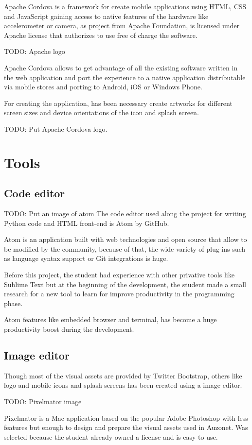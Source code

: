 \documentclass{DeustoFDP}
\begin{document}
Apache Cordova is a framework for create mobile applications using HTML, CSS and JavaScript gaining access to native features of the hardware like accelerometer or camera, as project from Apache Foundation, is licensed under Apache license that authorizes to use free of charge the software.

TODO: Apache logo

Apache Cordova allows to get advantage of all the existing software written in the web application and port the experience to a native application distributable via mobile stores and porting to Android, iOS or Windows Phone.

For creating the application, has been necessary create artworks for different screen sizes and device orientations of the icon and splash screen.

TODO: Put Apache Cordova logo.
\section{Tools}
\subsection{Code editor}
TODO: Put an image of atom
The code editor used along the project for writing Python code and HTML front-end is Atom by GitHub.

Atom is an application built with web technologies and open source that allow to be modified by the community, because of that, the wide variety of plug-ins such as language syntax support or Git integrations is huge.

Before this project, the student had experience with other privative tools like Sublime Text but at the beginning of the development, the student made a small research for a new tool to learn for improve productivity in the programming phase.

Atom features like embedded browser and terminal, has become a huge productivity boost during the development.
\subsection{Image editor}
Though most of the visual assets are provided by Twitter Bootstrap, others like logo and mobile icons and splash screens has been created using a image editor.

TODO: Pixelmator image

Pixelmator is a Mac application based on the popular Adobe Photoshop with less features but enough to design and prepare the visual assets used in Auzonet. Was selected because the student already owned a license and is easy to use.
\end{document}
